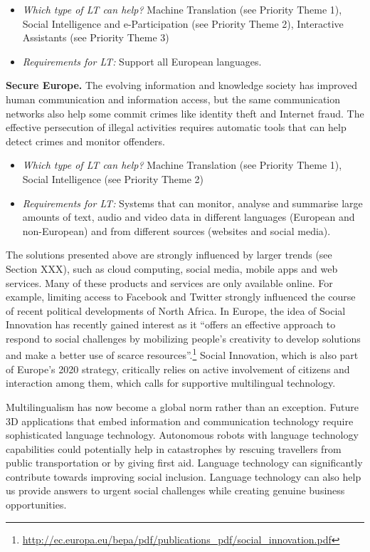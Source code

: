 \documentclass[10pt, plain]{../../metanetpaper}
\begin{document}
\begin{multicols}{2}
\begin{itemize}
\item \emph{Which type of LT can help?} Machine Translation (see Priority Theme 1), Social Intelligence and e-Participation (see Priority Theme 2), Interactive Assistants (see Priority Theme 3)
\item \emph{Requirements for LT:} Support all European languages.
\end{itemize}

\textbf{Secure Europe.} The evolving information and knowledge society has improved human communication and information access, but the same communication networks also help some commit crimes like identity theft and Internet fraud. The effective persecution of illegal activities requires automatic tools that can help detect crimes and monitor offenders. 

\begin{itemize}
\item \emph{Which type of LT can help?} Machine Translation (see Priority Theme 1), Social Intelligence (see Priority Theme 2)
\item \emph{Requirements for LT:} Systems that can monitor, analyse and summarise large amounts of text, audio and video data in different languages (European and non-European) and from different sources (websites and social media).
\end{itemize}

The solutions presented above are strongly influenced by larger trends (see Section XXX), such as cloud computing, social media, mobile apps and web services. Many of these products and services are only available online. For example, limiting access to Facebook and Twitter strongly influenced the course of recent political developments of North Africa. In Europe, the idea of Social Innovation has recently gained interest as it “offers an effective approach to respond to social challenges by mobilizing people's creativity to develop solutions and make a better use of scarce resources”.\footnote{\url{http://ec.europa.eu/bepa/pdf/publications_pdf/social_innovation.pdf}} Social Innovation, which is also part of Europe’s 2020 strategy, critically relies on active involvement of citizens and interaction among them, which calls for supportive multilingual technology. 

Multilingualism has now become a global norm rather than an exception. Future 3D applications that embed information and communication technology require sophisticated language technology. Autonomous robots with language technology capabilities could potentially help in catastrophes by rescuing travellers from public transportation or by giving first aid.  Language technology can significantly contribute towards improving social inclusion. Language technology can also help us provide answers to urgent social challenges while creating genuine business opportunities.


\end{multicols}
\end{document}
